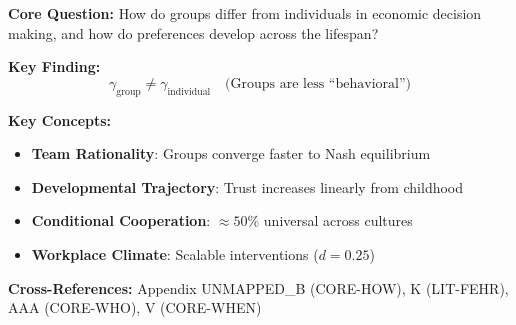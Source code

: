 \begin{tcolorbox}[colback=blue!5!white, colframe=blue!75!black,
    title=Quick Reference: Matthias Sutter's Contributions]

\textbf{Core Question:} How do groups differ from individuals in economic decision making, and how do preferences develop across the lifespan?

\textbf{Key Finding:}
\begin{equation}
\gamma_{\text{group}} \neq \gamma_{\text{individual}} \quad \text{(Groups are less ``behavioral'')}
\end{equation}

\textbf{Key Concepts:}
\begin{itemize}[nosep]
\item \textbf{Team Rationality}: Groups converge faster to Nash equilibrium
\item \textbf{Developmental Trajectory}: Trust increases linearly from childhood
\item \textbf{Conditional Cooperation}: $\approx 50\%$ universal across cultures
\item \textbf{Workplace Climate}: Scalable interventions ($d = 0.25$)
\end{itemize}

\textbf{Cross-References:} Appendix UNMAPPED_B (CORE-HOW), K (LIT-FEHR), AAA (CORE-WHO), V (CORE-WHEN)
\end{tcolorbox}


